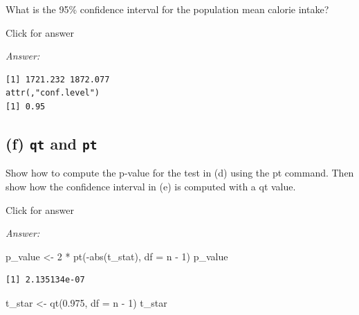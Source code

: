 \documentclass[
]{book}
\newenvironment{Shaded}{\begin{snugshade}}{\end{snugshade}}
\newcommand{\AttributeTok}[1]{\textcolor[rgb]{0.77,0.63,0.00}{#1}}
\newcommand{\DecValTok}[1]{\textcolor[rgb]{0.00,0.00,0.81}{#1}}
\newcommand{\FloatTok}[1]{\textcolor[rgb]{0.00,0.00,0.81}{#1}}
\newcommand{\FunctionTok}[1]{\textcolor[rgb]{0.00,0.00,0.00}{#1}}
\newcommand{\NormalTok}[1]{#1}
\newcommand{\OtherTok}[1]{\textcolor[rgb]{0.56,0.35,0.01}{#1}}
\newcommand{\SpecialCharTok}[1]{\textcolor[rgb]{0.00,0.00,0.00}{#1}}
\begin{document}
What is the 95\% confidence interval for the population mean calorie intake?

Click for answer

\emph{Answer:}

\begin{Shaded}
\end{Shaded}

\begin{verbatim}
[1] 1721.232 1872.077
attr(,"conf.level")
[1] 0.95
\end{verbatim}

\hypertarget{f-qt-and-pt-1}{%
\subsection{\texorpdfstring{(f) \texttt{qt} and \texttt{pt}}{(f) qt and pt}}\label{f-qt-and-pt-1}}

Show how to compute the p-value for the test in (d) using the pt command. Then show how the confidence interval in (e) is computed with a qt value.

Click for answer

\emph{Answer:}

\begin{Shaded}
\begin{Highlighting}[]
\NormalTok{p\_value }\OtherTok{\textless{}{-}} \DecValTok{2} \SpecialCharTok{*} \FunctionTok{pt}\NormalTok{(}\SpecialCharTok{{-}}\FunctionTok{abs}\NormalTok{(t\_stat), }\AttributeTok{df =}\NormalTok{ n }\SpecialCharTok{{-}} \DecValTok{1}\NormalTok{)}
\NormalTok{p\_value}
\end{Highlighting}
\end{Shaded}

\begin{verbatim}
[1] 2.135134e-07
\end{verbatim}

\begin{Shaded}
\begin{Highlighting}[]
\NormalTok{t\_star }\OtherTok{\textless{}{-}} \FunctionTok{qt}\NormalTok{(}\FloatTok{0.975}\NormalTok{, }\AttributeTok{df =}\NormalTok{ n }\SpecialCharTok{{-}} \DecValTok{1}\NormalTok{)}
\NormalTok{t\_star}
\end{Highlighting}
\end{Shaded}
\end{document}
